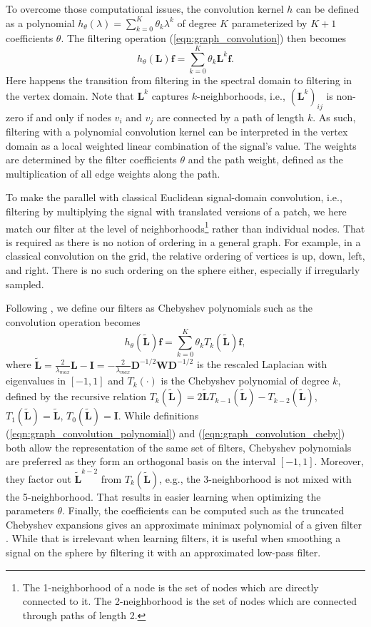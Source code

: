 \documentclass[final,twocolumn,3p,times,authoryear]{elsarticle}
\newcommand{\todo}[1]{{\color[rgb]{.6,.1,.6}{#1}}}
\newcommand{\eqnref}[1]{(\ref{eqn:#1})}
\renewcommand{\b}[1]{{\bm{#1}}}   %
\newcommand{\1}{\b{1}}              %
\newcommand{\0}{\b{0}}              %
\renewcommand{\L}{\b{L}}
\newcommand{\tL}{\tilde{\L}}
\newcommand{\W}{\b{W}}
\newcommand{\D}{\b{D}}
\newcommand{\f}{\b{f}}
\begin{document}
To overcome those computational issues, the convolution kernel $h$ can be defined as a polynomial $h_\theta(\lambda) = \sum_{k=0}^K \theta_k \lambda^k$ of degree $K$ parameterized by $K+1$ coefficients $\theta$. The filtering operation \eqnref{graph_convolution} then becomes
\begin{equation} \label{eqn:graph_convolution_polynomial}
	h_\theta(\L) \f = \sum_{k=0}^K \theta_k \L^k \f.
\end{equation}
Here happens the transition from filtering in the spectral domain to filtering in the vertex domain. Note that $\L^k$ captures $k$-neighborhoods, i.e., $(\L^k)_{ij}$ is non-zero if and only if nodes $v_i$ and $v_j$ are connected by a path of length $k$. As such, filtering with a polynomial convolution kernel can be interpreted in the vertex domain as a local weighted linear combination of the signal's value. The weights are determined by the filter coefficients $\theta$ and the path weight, defined as the multiplication of all edge weights along the path.
\todo{Better vertex domain explanation.}

To make the parallel with classical Euclidean signal-domain convolution, i.e., filtering by multiplying the signal with translated versions of a patch, we here match our filter at the level of neighborhoods\footnote{The 1-neighborhood of a node is the set of nodes which are directly connected to it. The 2-neighborhood is the set of nodes which are connected through paths of length 2.} rather than individual nodes. That is required as there is no notion of ordering in a general graph. For example, in a classical convolution on the grid, the relative ordering of vertices is up, down, left, and right. There is no such ordering on the sphere either, especially if irregularly sampled.

Following \citet{defferrard2016convolutional}, we define our filters as Chebyshev polynomials such as the convolution operation becomes
\begin{equation} \label{eqn:graph_convolution_cheby}
	h_\theta(\tL) \f = \sum_{k=0}^K \theta_k T_k(\tL) \f,
\end{equation}
where $\tL = \frac{2}{\lambda_{max}} \L - \b{I} = -\frac{2}{\lambda_{max}} \D^{-1/2} \W \D^{-1/2}$ is the rescaled Laplacian with eigenvalues in $[-1, 1]$ and $T_k(\cdot)$ is the Chebyshev polynomial of degree $k$, defined by the recursive relation $T_k(\tL) = 2\tL T_{k-1}(\tL) - T_{k-2}(\tL)$, $T_1(\tL) = \tL$, $T_0(\tL) = \b{I}$. While definitions \eqnref{graph_convolution_polynomial} and \eqnref{graph_convolution_cheby} both allow the representation of the same set of filters, Chebyshev polynomials are preferred as they form an orthogonal basis on the interval $[-1, 1]$. Moreover, they factor out $\tL^{k-2}$ from $T_k(\tL)$, e.g., the 3-neighborhood is not mixed with the 5-neighborhood. That results in easier learning when optimizing the parameters $\theta$.
Finally, the coefficients can be computed such as the truncated Chebyshev expansions gives an approximate minimax polynomial of a given filter \citep{hammond2011wavelets}. While that is irrelevant when learning filters, it is useful when smoothing a signal on the sphere by filtering it with an approximated low-pass filter.
\end{document}
